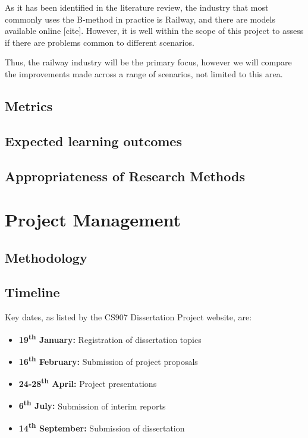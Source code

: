 \documentclass[11pt,journal]{IEEEtran}
\begin{document}
	As it has been identified in the literature review, the industry that most commonly uses the B-method in practice is Railway, and there are models available online [cite]. However, it is well within the scope of this project to assess if there are problems common to different scenarios.
	
	Thus, the railway industry will be the primary focus, however we will compare the improvements made across a range of scenarios, not limited to this area.
	
	\subsection{Metrics}
	
	\subsection{Expected learning outcomes}
	
	\subsection{Appropriateness of Research Methods}
	
	\section{Project Management}
	
	\subsection{Methodology}
	
	\subsection{Timeline}
	Key dates, as listed by the CS907 Dissertation Project website, are:
	
	\begin{itemize}
		\item \textbf{19\textsuperscript{th} January:} Registration of dissertation topics
		\item \textbf{16\textsuperscript{th} February:} Submission of project proposals
		\item \textbf{24-28\textsuperscript{th} April:} Project presentations
		\item \textbf{6\textsuperscript{th} July:} Submission of interim reports
		\item \textbf{14\textsuperscript{th} September:} Submission of dissertation
	\end{itemize}
\end{document}
